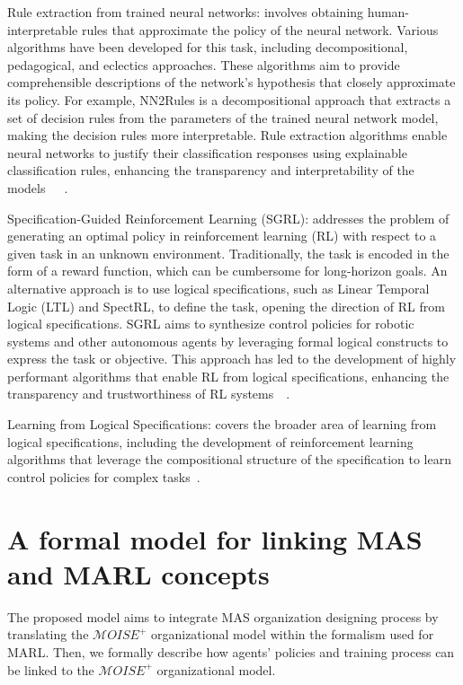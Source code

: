 \documentclass[runningheads]{llncs}
\begin{document}
Rule extraction from trained neural networks: involves obtaining human-interpretable rules that approximate the policy of the neural network. Various algorithms have been developed for this task, including decompositional, pedagogical, and eclectics approaches. These algorithms aim to provide comprehensible descriptions of the network's hypothesis that closely approximate its policy. For example, NN2Rules is a decompositional approach that extracts a set of decision rules from the parameters of the trained neural network model, making the decision rules more interpretable. Rule extraction algorithms enable neural networks to justify their classification responses using explainable classification rules, enhancing the transparency and interpretability of the models~\cite{Hailesilassie2016}~\cite{Sato2001}~\cite{Lal2022}.

Specification-Guided Reinforcement Learning (SGRL): addresses the problem of generating an optimal policy in reinforcement learning (RL) with respect to a given task in an unknown environment. Traditionally, the task is encoded in the form of a reward function, which can be cumbersome for long-horizon goals. An alternative approach is to use logical specifications, such as Linear Temporal Logic (LTL) and SpectRL, to define the task, opening the direction of RL from logical specifications. SGRL aims to synthesize control policies for robotic systems and other autonomous agents by leveraging formal logical constructs to express the task or objective. This approach has led to the development of highly performant algorithms that enable RL from logical specifications, enhancing the transparency and trustworthiness of RL systems~\cite{Bansal2022}~\cite{Jothimurugan2023}.

Learning from Logical Specifications: covers the broader area of learning from logical specifications, including the development of reinforcement learning algorithms that leverage the compositional structure of the specification to learn control policies for complex tasks~\cite{Jothimurugan2021}.


\section{A formal model for linking MAS and MARL concepts}

The proposed model aims to integrate MAS organization designing process by translating the $\mathcal{M}OISE^{+}$ organizational model within the formalism used for MARL. Then, we formally describe how agents' policies and training process can be linked to the $\mathcal{M}OISE^{+}$ organizational model.
\end{document}
